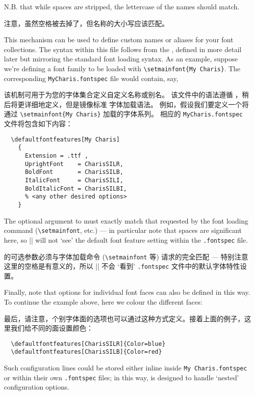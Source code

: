 \documentclass[a4paper]{l3doc}
\begin{document}
N.B. that while spaces are stripped, the lettercase of the names should match.

注意，虽然空格被去掉了，但名称的大小写应该匹配。


This mechanism can be used to define custom names or aliases for your font collections.
The syntax within this file follows from the , defined in more detail later but mirroring the standard  font loading syntax.
As an example, suppose we're defining a font family to be loaded with \verb|\setmainfont{My Charis}|.
The corresponding \texttt{MyCharis.fontspec} file would contain, say,

该机制可用于为您的字体集合定义自定义名称或别名。
该文件中的语法遵循 ，稍后将更详细地定义，但是镜像标准  字体加载语法。
例如，假设我们要定义一个将通过 \verb|\setmainfont{My Charis}| 加载的字体系列。
相应的 \texttt{MyCharis.fontspec} 文件将包含如下内容：
\begin{Verbatim}
  \defaultfontfeatures[My Charis]
    {
      Extension = .ttf ,
      UprightFont    = CharisSILR,
      BoldFont       = CharisSILB,
      ItalicFont     = CharisSILI,
      BoldItalicFont = CharisSILBI,
      % <any other desired options>
    }
\end{Verbatim}
The optional argument to  must exactly match that requested by the font loading command (\verb|\setmainfont|, etc.) --- in particular note that spaces are significant here, so |\setmainfont{MyCharis}| will not `see' the default font feature setting within the \texttt{.fontspec} file.

 的可选参数必须与字体加载命令 (\verb|\setmainfont| 等) 请求的完全匹配 — 特别注意这里的空格是有意义的，所以 |\setmainfont{MyCharis}| 不会 `看到' \texttt{.fontspec} 文件中的默认字体特性设置。

Finally, note that options for individual font faces can also be defined in this way.
To continue the example above, here we colour the different faces:

最后，请注意，个别字体面的选项也可以通过这种方式定义。接着上面的例子，这里我们给不同的面设置颜色：

\begin{Verbatim}
  \defaultfontfeatures[CharisSILR]{Color=blue}
  \defaultfontfeatures[CharisSILB]{Color=red}
\end{Verbatim}
Such configuration lines could be stored either inline inside \texttt{My Charis.fontspec}
or within their own \texttt{.fontspec} files; in this way,  is designed to
handle `nested' configuration options.
\end{document}
